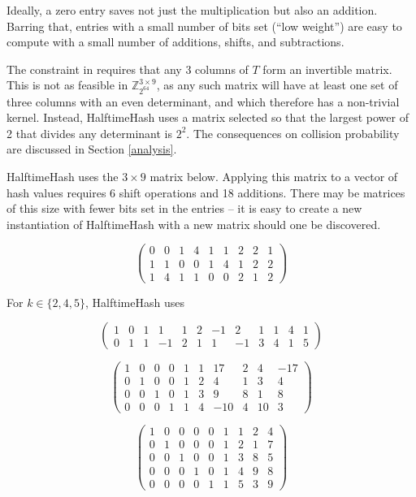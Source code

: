 \documentclass[sigconf, nonacm]{acmart}
\newcommand{\ints}{\mathbb{Z}}
\begin{document}
Ideally, a zero entry saves not just the multiplication but also an addition.
Barring that, entries with a small number of bits set (``low weight'') are easy to compute with a small number of additions, shifts, and subtractions.

The constraint in \cite{ehc-nandi} requires that any 3 columns of $T$ form an invertible matrix.
This is not as feasible in $\ints_{2^{64}}^{3 \times 9}$, as any such matrix will have at least one set of three columns with an even determinant, and which therefore has a non-trivial kernel.
Instead, HalftimeHash uses a matrix selected so that the largest power of 2 that divides any determinant is $2^2$.
The consequences on collision probability are discussed in Section \ref{analysis}.

HalftimeHash uses the $3 \times 9$ matrix below.
Applying this matrix to a vector of hash values requires 6 shift operations and 18 additions.
There may be matrices of this size with fewer bits set in the entries -- it is easy to create a new instantiation of HalftimeHash with a new matrix should one be discovered.

\begin{displaymath}
  \left(
\begin{array}{rrrrrrrrr}
  0 & 0 & 1 & 4 & 1 & 1 & 2 & 2 & 1\\
  1 & 1 & 0 & 0 & 1 & 4 & 1 & 2 & 2\\
  1 & 4 & 1 & 1 & 0 & 0 & 2 & 1 & 2
\end{array}
\right)
\end{displaymath}

For $k \in \{2, 4, 5\}$, HalftimeHash uses

\[
\left(
\begin{array}{rrrrrrrrrrrr}
  1 & 0 & 1 & 1 & 1 & 2 & -1 & 2 & 1 & 1 & 4 & 1\\
  0 & 1 & 1 & -1 & 2 & 1 & 1 & -1 & 3 & 4 & 1 & 5
\end{array}
\right)
\]

\[
\left(
\begin{array}{rrrrrrrrrr}
  1 &  0 &   0&   0&   1&   1&  17&   2&   4& -17 \\
  0  & 1&   0  & 0&   1  & 2&   4  & 1&   3  & 4\\
  0 &  0 &  1 &  0 &  1 &  3 &  9 &  8 &  1 &  8\\
  0&   0  & 0&   1  & 1&   4 &-10&   4  &10&   3
\end{array}
\right)
\]

\[
\left(
\begin{array}{rrrrrrrrr}
 1 & 0 & 0 & 0 & 0 & 1 & 1 & 2 & 4\\
 0 & 1 & 0 & 0 & 0 & 1 & 2 & 1 & 7\\
 0 & 0 & 1 & 0 & 0 & 1 & 3 & 8 & 5\\
 0 & 0 & 0 & 1 & 0 & 1 & 4 & 9 & 8\\
 0 & 0 & 0 & 0 & 1 & 1 & 5 & 3 & 9
\end{array}
\right)
\]
\end{document}
